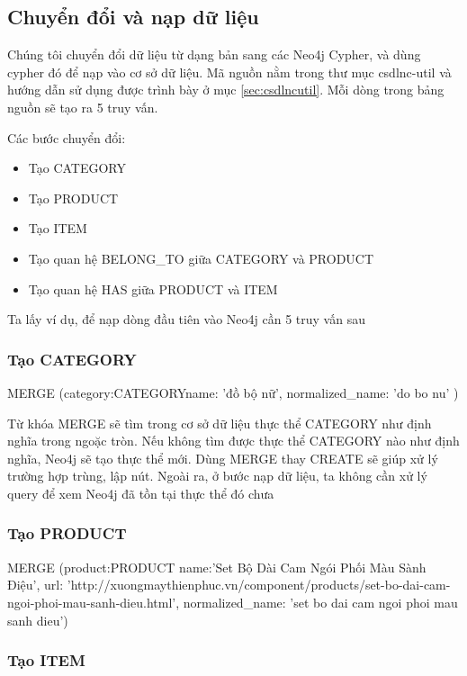 \subsection{Chuyển đổi và nạp dữ liệu}
Chúng tôi chuyển đổi dữ liệu từ dạng bản sang các Neo4j Cypher, và dùng cypher đó để nạp vào cơ sở dữ liệu. Mã nguồn nằm trong thư mục csdlnc-util và hướng dẫn sử dụng được trình bày ở mục \ref{sec:csdlncutil}. Mỗi dòng trong bảng nguồn sẽ tạo ra 5 truy vấn. 

Các bước chuyển đổi: 
\begin{itemize}
\item Tạo CATEGORY 
\item Tạo PRODUCT 
\item Tạo ITEM
\item Tạo quan hệ BELONG\_TO giữa CATEGORY và PRODUCT 
\item Tạo quan hệ HAS giữa PRODUCT và ITEM
\end{itemize}

Ta lấy ví dụ, để nạp dòng đầu tiên vào Neo4j cần 5 truy vấn sau

\subsubsection{Tạo CATEGORY}\label{sec:mergecategory}
MERGE (category:CATEGORY{name: 'đồ bộ nữ', normalized\_name: 'do bo nu' })

Từ khóa MERGE sẽ tìm trong cơ sở dữ liệu thực thể CATEGORY như định nghĩa trong ngoặc tròn. Nếu không tìm được thực thể CATEGORY nào như định nghĩa, Neo4j sẽ tạo thực thể mới. Dùng MERGE thay CREATE sẽ giúp xử lý trường hợp trùng, lập nút. Ngoài ra, ở bước nạp dữ liệu, ta không cần xử lý query để xem Neo4j đã tồn tại thực thể đó chưa 

\subsubsection{Tạo PRODUCT}\label{sec:mergeproduct}

MERGE (product:PRODUCT{ name:'Set Bộ Dài Cam Ngói Phối Màu Sành Điệu', url: 'http://xuongmaythienphuc.vn/component/products/set-bo-dai-cam-ngoi-phoi-mau-sanh-dieu.html', normalized\_name: 'set bo dai cam ngoi phoi mau sanh dieu'})

\subsubsection{Tạo ITEM}\label{sec:mergeitem}

